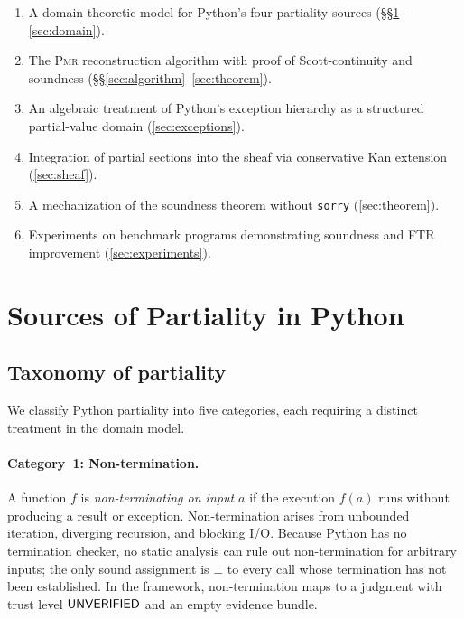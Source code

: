 \documentclass[11pt]{article}
\newcommand{\PMR}{\textsc{Pmr}}            %
\begin{document}
\begin{enumerate}
  \item A domain-theoretic model for Python's four partiality sources
        (\S\S\ref{sec:partiality}--\ref{sec:domain}).
  \item The \PMR{} reconstruction algorithm with proof of
        Scott-continuity and soundness (\S\S\ref{sec:algorithm}--\ref{sec:theorem}).
  \item An algebraic treatment of Python's exception hierarchy as a
        structured partial-value domain (\cref{sec:exceptions}).
  \item Integration of partial sections into the \JuGeo{} sheaf via
        conservative Kan extension (\cref{sec:sheaf}).
  \item A \LEAN{} mechanization of the soundness theorem without
        \texttt{sorry} (\cref{sec:theorem}).
  \item Experiments on \expTotalPrograms{} benchmark programs demonstrating \expAccuracy{}
        soundness and FTR improvement (\cref{sec:experiments}).
\end{enumerate}

\section{Sources of Partiality in Python}\label{sec:partiality}

\subsection{Taxonomy of partiality}

We classify Python partiality into five categories, each requiring a
distinct treatment in the domain model.

\paragraph{Category~1: Non-termination.}
A function $f$ is \emph{non-terminating on input $a$} if the execution
$f(a)$ runs without producing a result or exception.  Non-termination
arises from unbounded iteration, diverging recursion, and blocking I/O.
Because Python has no termination checker, no static analysis can rule
out non-termination for arbitrary inputs; the only sound assignment is
$\bot$ to every call whose termination has not been established.  In
the \JuGeo{} framework, non-termination maps to a judgment with trust
level $\mathsf{UNVERIFIED}$ and an empty evidence bundle.
\end{document}

